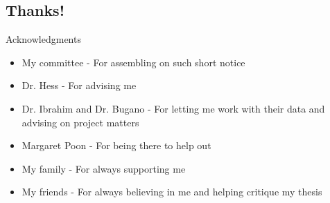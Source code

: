 \subsection{Thanks!}
\begin{frame}{Acknowledgments}
 \begin{itemize}
  \item My committee - For assembling on such short notice
  \item Dr. Hess - For advising me 
  \item Dr. Ibrahim and Dr. Bugano - For letting me work with their data and advising
  on project matters
  \item Margaret Poon - For being there to help out
  \item My family - For always supporting me
  \item My friends - For always believing in me and helping critique my thesis
  
 \end{itemize}

\end{frame}

